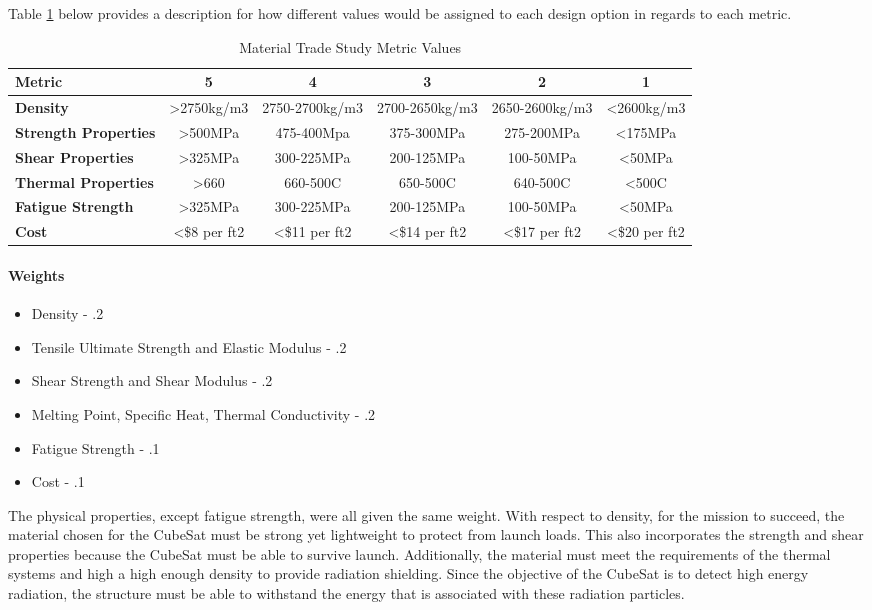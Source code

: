 Table \ref{tbl:material_Metric_Scores} below provides a description for how different values would be assigned to each design option in regards to each metric. 

\begin{table}[H]
\centering
\begin{tabular}{|l|c|c|c|c|c|} 
\hline
    \textbf{Metric} & \textbf{5} & \textbf{4} & \textbf{3} & \textbf{2} & \textbf{1}
    \\
\hline
    \textbf{Density} & >2750kg/m3 & 2750-2700kg/m3 & 2700-2650kg/m3 & 2650-2600kg/m3 & <2600kg/m3
    \\
\hline
    \textbf{Strength Properties} & >500MPa & 475-400Mpa & 375-300MPa & 275-200MPa & <175MPa 
    \\
\hline
    \textbf{Shear Properties} & >325MPa & 300-225MPa & 200-125MPa & 100-50MPa & <50MPa 
    \\
\hline
    \textbf{Thermal Properties} & >660 & 660-500C & 650-500C & 640-500C & <500C 
    \\
\hline
    \textbf{Fatigue Strength} & >325MPa & 300-225MPa & 200-125MPa & 100-50MPa & <50MPa 
    \\
\hline
    \textbf{Cost} & <\$8 per ft2 & <\$11 per ft2 & <\$14 per ft2 & <\$17 per ft2 & <\$20 per ft2
    \\

\hline
\end{tabular}
\caption{Material Trade Study Metric Values}
\label{tbl:material_Metric_Scores}
\end{table}


\paragraph{Weights}
\begin{itemize}
    \item Density - .2
    \item Tensile Ultimate Strength and Elastic Modulus - .2
    \item Shear Strength and Shear Modulus - .2
    \item Melting Point, Specific Heat, Thermal Conductivity - .2
    \item Fatigue Strength - .1
    \item Cost - .1
\end{itemize}

The physical properties, except fatigue strength, were all given the same weight. With respect to density, for the mission to succeed, the material chosen for the CubeSat must be strong yet lightweight to protect from launch loads. This also incorporates the strength and shear properties because the CubeSat must be able to survive launch. Additionally, the material must meet the requirements of the thermal systems and high a high enough density to provide radiation shielding. Since the objective of the CubeSat is to detect high energy radiation, the structure must be able to withstand the energy that is associated with these radiation particles. 

